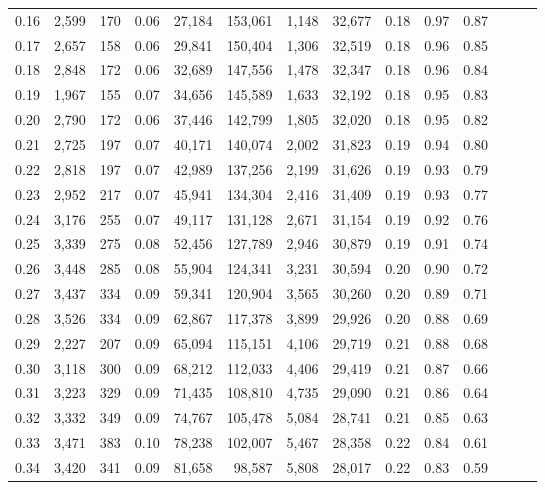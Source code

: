 \begin{tabular}{rrrrrrrrrrrrrr}
0.16 &  2,599 &  170 &  0.06 &   27,184 &  153,061 &   1,148 &  32,677 &  0.18 &  0.97 &      0.87 \\
0.17 &  2,657 &  158 &  0.06 &   29,841 &  150,404 &   1,306 &  32,519 &  0.18 &  0.96 &      0.85 \\
0.18 &  2,848 &  172 &  0.06 &   32,689 &  147,556 &   1,478 &  32,347 &  0.18 &  0.96 &      0.84 \\
0.19 &  1,967 &  155 &  0.07 &   34,656 &  145,589 &   1,633 &  32,192 &  0.18 &  0.95 &      0.83 \\
0.20 &  2,790 &  172 &  0.06 &   37,446 &  142,799 &   1,805 &  32,020 &  0.18 &  0.95 &      0.82 \\
0.21 &  2,725 &  197 &  0.07 &   40,171 &  140,074 &   2,002 &  31,823 &  0.19 &  0.94 &      0.80 \\
0.22 &  2,818 &  197 &  0.07 &   42,989 &  137,256 &   2,199 &  31,626 &  0.19 &  0.93 &      0.79 \\
0.23 &  2,952 &  217 &  0.07 &   45,941 &  134,304 &   2,416 &  31,409 &  0.19 &  0.93 &      0.77 \\
0.24 &  3,176 &  255 &  0.07 &   49,117 &  131,128 &   2,671 &  31,154 &  0.19 &  0.92 &      0.76 \\
0.25 &  3,339 &  275 &  0.08 &   52,456 &  127,789 &   2,946 &  30,879 &  0.19 &  0.91 &      0.74 \\
0.26 &  3,448 &  285 &  0.08 &   55,904 &  124,341 &   3,231 &  30,594 &  0.20 &  0.90 &      0.72 \\
0.27 &  3,437 &  334 &  0.09 &   59,341 &  120,904 &   3,565 &  30,260 &  0.20 &  0.89 &      0.71 \\
0.28 &  3,526 &  334 &  0.09 &   62,867 &  117,378 &   3,899 &  29,926 &  0.20 &  0.88 &      0.69 \\
0.29 &  2,227 &  207 &  0.09 &   65,094 &  115,151 &   4,106 &  29,719 &  0.21 &  0.88 &      0.68 \\
0.30 &  3,118 &  300 &  0.09 &   68,212 &  112,033 &   4,406 &  29,419 &  0.21 &  0.87 &      0.66 \\
0.31 &  3,223 &  329 &  0.09 &   71,435 &  108,810 &   4,735 &  29,090 &  0.21 &  0.86 &      0.64 \\
0.32 &  3,332 &  349 &  0.09 &   74,767 &  105,478 &   5,084 &  28,741 &  0.21 &  0.85 &      0.63 \\
0.33 &  3,471 &  383 &  0.10 &   78,238 &  102,007 &   5,467 &  28,358 &  0.22 &  0.84 &      0.61 \\
0.34 &  3,420 &  341 &  0.09 &   81,658 &   98,587 &   5,808 &  28,017 &  0.22 &  0.83 &      0.59 \\

\end{tabular}
